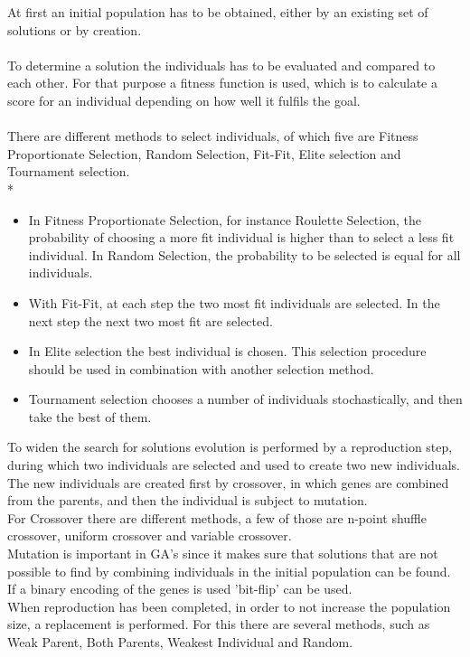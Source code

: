 At first an initial population has to be obtained, either by an existing set of solutions or by creation.\\
\\To determine a solution the individuals has to be evaluated and compared to each other. For that purpose a fitness function is used, which is to calculate a score for an individual depending on how well it fulfils the goal.\\
\\There are different methods to select individuals, of which five are Fitness Proportionate Selection, Random Selection, Fit-Fit, Elite selection and Tournament selection.\\*
\begin{itemize}
\item In Fitness Proportionate Selection, for instance Roulette Selection, the probability of choosing a more fit individual is higher than to select a less fit individual.
In Random Selection, the probability to be selected is equal for all individuals. 
\item With Fit-Fit, at each step the two most fit individuals are selected. In the next step the next two most fit are selected.
\item In Elite selection the best individual is chosen. This selection procedure should be used in combination with another selection method.
\item Tournament selection chooses a number of individuals stochastically, and then take the best of them.
\end{itemize}
To widen the search for solutions evolution is performed by a reproduction step, during which two individuals are selected and used to create two new individuals. The new individuals are created first by crossover, in which genes are combined from the parents, and then the individual is subject to mutation.\\
For Crossover there are different methods, a few of those are n-point shuffle crossover, uniform crossover and variable crossover.\\
Mutation is important in GA's since it makes sure that solutions that are not possible to find by combining individuals in the initial population can be found. If a binary encoding of the genes is used 'bit-flip' can be used.\\
When reproduction has been completed, in order to not increase the population size, a replacement is performed. For this there are several methods, such as Weak Parent, Both Parents, Weakest Individual and Random.
